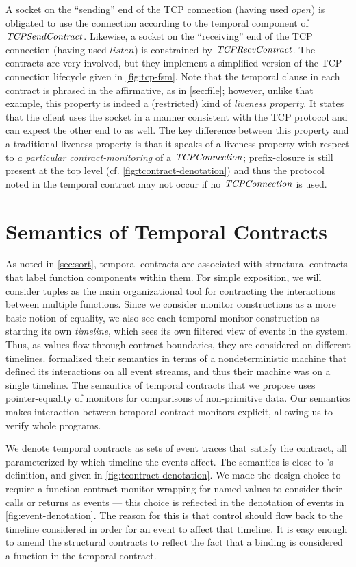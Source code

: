 A socket on the ``sending'' end of the TCP connection (having used $open$) is obligated to use the connection according to the temporal component of $\mathit{TCPSendContract}$.
%
Likewise, a socket on the ``receiving'' end of the TCP connection (having used $listen$) is constrained by $\mathit{TCPRecvContract}$.
%
The contracts are very involved, but they implement a simplified version of the TCP connection lifecycle given in \autoref{fig:tcp-fsm}.
%
Note that the temporal clause in each contract is phrased in the affirmative, as in \autoref{sec:file}; however, unlike that example, this property is indeed a (restricted) kind of \emph{liveness property}.
%
It states that the client uses the socket in a manner consistent with the TCP protocol and can expect the other end to as well.
%
The key difference between this property and a traditional liveness property is that it speaks of a liveness property with respect to \emph{a particular contract-monitoring} of a $\mathit{TCPConnection}$; prefix-closure is still present at the top level (cf. \autoref{fig:tcontract-denotation}) and thus the protocol noted in the temporal contract may not occur if no $\mathit{TCPConnection}$ is used.

\section{Semantics of Temporal Contracts} \label{sec:temporal-semantics}

As noted in \autoref{sec:sort}, temporal contracts are associated with structural contracts that label function components within them.
%
For simple exposition, we will consider tuples as the main organizational tool for contracting the interactions between multiple functions.
%
Since we consider monitor constructions as a more basic notion of equality, we also see each temporal monitor construction as starting its own \emph{timeline}, which sees its own filtered view of events in the system.
%
Thus, as values flow through contract boundaries, they are considered on different timelines.
%
\citeauthor{ianjohnson:dfm:icfp2011} formalized their semantics in terms of a nondeterministic machine that defined its interactions on all event streams, and thus their machine was on a single timeline.
%
The semantics of temporal contracts that we propose uses pointer-equality of monitors for comparisons of non-primitive data.
%
Our semantics makes interaction between temporal contract monitors explicit, allowing us to verify whole programs.

We denote temporal contracts as sets of event traces that satisfy the contract, all parameterized by which timeline the events affect.
%
The semantics is close to \citeauthor{ianjohnson:dfm:icfp2011}'s definition, and given in \autoref{fig:tcontract-denotation}.
%
We made the design choice to require a function contract monitor wrapping for named values to consider their calls or returns as events --- this choice is reflected in the denotation of events in \autoref{fig:event-denotation}.
%
The reason for this is that control should flow back to the timeline considered in order for an event to affect that timeline.
%
It is easy enough to amend the structural contracts to reflect the fact that a binding is considered a function in the temporal contract.

